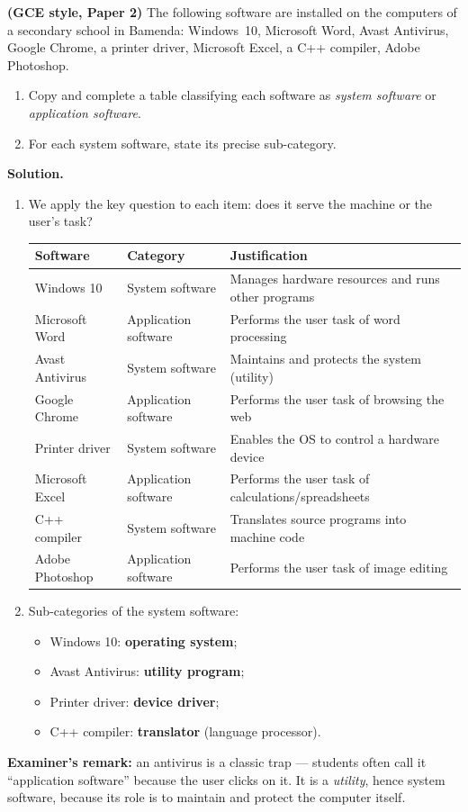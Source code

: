 \documentclass[11pt]{article}
\begin{document}
\begin{exoresolu}
\textbf{(GCE style, Paper 2)} The following software are installed on the computers of a secondary school in Bamenda: Windows~10, Microsoft Word, Avast Antivirus, Google Chrome, a printer driver, Microsoft Excel, a C++ compiler, Adobe Photoshop.
\begin{enumerate}
\item Copy and complete a table classifying each software as \emph{system software} or \emph{application software}.
\item For each system software, state its precise sub-category.
\end{enumerate}
\tcblower
\textbf{Solution.}
\begin{enumerate}
\item We apply the key question to each item: does it serve the machine or the user's task?
\begin{center}
\begin{tabularx}{\linewidth}{|l|X|X|}
\hline
\rowcolor{popblueL} \textbf{Software} & \textbf{Category} & \textbf{Justification} \\
\hline
Windows 10 & System software & Manages hardware resources and runs other programs \\
\hline
Microsoft Word & Application software & Performs the user task of word processing \\
\hline
Avast Antivirus & System software & Maintains and protects the system (utility) \\
\hline
Google Chrome & Application software & Performs the user task of browsing the web \\
\hline
Printer driver & System software & Enables the OS to control a hardware device \\
\hline
Microsoft Excel & Application software & Performs the user task of calculations/spreadsheets \\
\hline
C++ compiler & System software & Translates source programs into machine code \\
\hline
Adobe Photoshop & Application software & Performs the user task of image editing \\
\hline
\end{tabularx}
\end{center}
\item Sub-categories of the system software:
\begin{itemize}
\item Windows 10: \textbf{operating system};
\item Avast Antivirus: \textbf{utility program};
\item Printer driver: \textbf{device driver};
\item C++ compiler: \textbf{translator} (language processor).
\end{itemize}
\end{enumerate}
\textbf{Examiner's remark:} an antivirus is a classic trap --- students often call it ``application software'' because the user clicks on it. It is a \emph{utility}, hence system software, because its role is to maintain and protect the computer itself.
\end{exoresolu}
\end{document}
